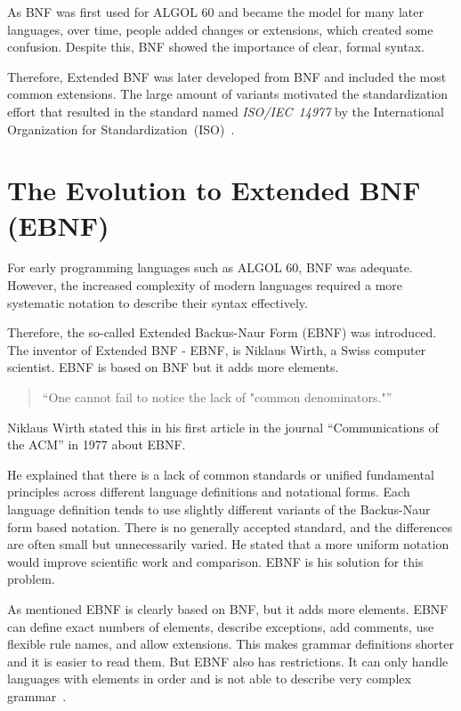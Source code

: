 As BNF was first used for ALGOL 60 and became the model for many later languages, over time, people added changes or extensions, which created some confusion. Despite this, BNF showed the importance of clear, formal syntax.

Therefore, Extended BNF was later developed from BNF and included the most common extensions. The large amount of variants motivated the standardization effort that resulted in the standard named \emph{ISO/IEC~14977} by the International Organization for Standardization~(ISO)~\cite[p.~V]{ISO/IEC149771996InformationBNF}.

\section{The Evolution to Extended BNF (EBNF)}

For early programming languages such as ALGOL 60, BNF was adequate. However, the increased complexity of modern languages required a more systematic notation to describe their syntax effectively.

Therefore, the so-called Extended Backus-Naur Form (EBNF) was introduced. The inventor of Extended BNF - EBNF, is Niklaus Wirth, a Swiss computer scientist. EBNF is based on BNF but it adds more elements.

\begin{quote}
``One cannot fail to notice the lack of "common denominators."''~\cite{Wirth1977WhatDefinitions}
\end{quote}

Niklaus Wirth stated this in his first article in the journal ``Communications of the ACM'' in 1977 about EBNF.

He explained that there is a lack of common standards or unified fundamental principles across different language definitions and notational forms. Each language definition tends to use slightly different variants of the Backus-Naur form based notation. There is no generally accepted standard, and the differences are often small but unnecessarily varied. He stated that a more uniform notation would improve scientific work and comparison. EBNF is his solution for this problem. 

As mentioned EBNF is clearly based on BNF, but it adds more elements. EBNF can define exact numbers of elements, describe exceptions, add comments, use flexible rule names, and allow extensions. This makes grammar definitions shorter and it is easier to read them. But EBNF also has restrictions. It can only handle languages with elements in order and is not able to describe very complex grammar~\cite[pp.~VII-VIII]{ISO/IEC149771996InformationBNF}.

